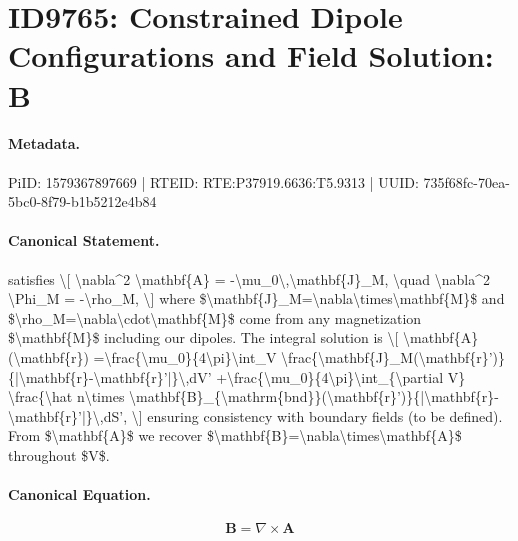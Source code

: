 \section*{ID9765: Constrained Dipole Configurations and Field Solution: B}
\paragraph{Metadata.}
PiID: 1579367897669 | RTEID: RTE:P37919.6636:T5.9313 | UUID: 735f68fc-70ea-5bc0-8f79-b1b5212e4b84

\paragraph{Canonical Statement.}
satisfies \textbackslash{}[ \textbackslash{}nabla\textasciicircum{}2 \textbackslash{}mathbf\{A\} = -\textbackslash{}mu\_0\textbackslash{},\textbackslash{}mathbf\{J\}\_M, \textbackslash{}quad \textbackslash{}nabla\textasciicircum{}2 \textbackslash{}Phi\_M = -\textbackslash{}rho\_M, \textbackslash{}] where \$\textbackslash{}mathbf\{J\}\_M=\textbackslash{}nabla\textbackslash{}times\textbackslash{}mathbf\{M\}\$ and \$\textbackslash{}rho\_M=\textbackslash{}nabla\textbackslash{}cdot\textbackslash{}mathbf\{M\}\$ come from any magnetization \$\textbackslash{}mathbf\{M\}\$ including our dipoles. The integral solution is \textbackslash{}[ \textbackslash{}mathbf\{A\}(\textbackslash{}mathbf\{r\}) =\textbackslash{}frac\{\textbackslash{}mu\_0\}\{4\textbackslash{}pi\}\textbackslash{}int\_V \textbackslash{}frac\{\textbackslash{}mathbf\{J\}\_M(\textbackslash{}mathbf\{r\}')\}\{|\textbackslash{}mathbf\{r\}-\textbackslash{}mathbf\{r\}'|\}\textbackslash{},dV' +\textbackslash{}frac\{\textbackslash{}mu\_0\}\{4\textbackslash{}pi\}\textbackslash{}int\_\{\textbackslash{}partial V\} \textbackslash{}frac\{\textbackslash{}hat n\textbackslash{}times \textbackslash{}mathbf\{B\}\_\{\textbackslash{}mathrm\{bnd\}\}(\textbackslash{}mathbf\{r\}')\}\{|\textbackslash{}mathbf\{r\}-\textbackslash{}mathbf\{r\}'|\}\textbackslash{},dS', \textbackslash{}] ensuring consistency with boundary fields (to be defined). From \$\textbackslash{}mathbf\{A\}\$ we recover \$\textbackslash{}mathbf\{B\}=\textbackslash{}nabla\textbackslash{}times\textbackslash{}mathbf\{A\}\$ throughout \$V\$.

\paragraph{Canonical Equation.}
\[
\mathbf{B}=\nabla\times\mathbf{A}
\]

